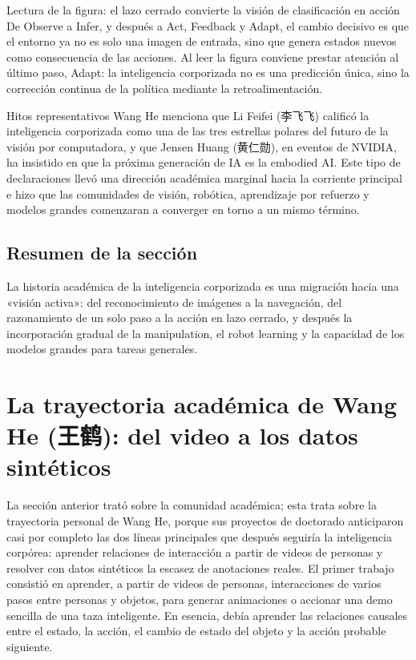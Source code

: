 \documentclass[a4paper]{article}
\begin{document}
\begin{knowledgebox}{Lectura de la figura: el lazo cerrado convierte la visión de clasificación en acción}
De Observe a Infer, y después a Act, Feedback y Adapt, el cambio decisivo es que el entorno ya no es solo una imagen de entrada, sino que genera estados nuevos como consecuencia de las acciones. Al leer la figura conviene prestar atención al último paso, Adapt: la inteligencia corporizada no es una predicción única, sino la corrección continua de la política mediante la retroalimentación.
\end{knowledgebox}

\begin{importantbox}{Hitos representativos}
Wang He menciona que Li Feifei (李飞飞) calificó la inteligencia corporizada como una de las tres estrellas polares del futuro de la visión por computadora, y que Jensen Huang (黄仁勋), en eventos de NVIDIA, ha insistido en que la próxima generación de IA es la embodied AI. Este tipo de declaraciones llevó una dirección académica marginal hacia la corriente principal e hizo que las comunidades de visión, robótica, aprendizaje por refuerzo y modelos grandes comenzaran a converger en torno a un mismo término.
\end{importantbox}

\subsection{Resumen de la sección}

La historia académica de la inteligencia corporizada es una migración hacia una «visión activa»: del reconocimiento de imágenes a la navegación, del razonamiento de un solo paso a la acción en lazo cerrado, y después la incorporación gradual de la manipulation, el robot learning y la capacidad de los modelos grandes para tareas generales.
\section{La trayectoria académica de Wang He (王鹤): del video a los datos sintéticos}

La sección anterior trató sobre la comunidad académica; esta trata sobre la trayectoria personal de Wang He, porque sus proyectos de doctorado anticiparon casi por completo las dos líneas principales que después seguiría la inteligencia corpórea: aprender relaciones de interacción a partir de videos de personas y resolver con datos sintéticos la escasez de anotaciones reales. El primer trabajo consistió en aprender, a partir de videos de personas, interacciones de varios pasos entre personas y objetos, para generar animaciones o accionar una demo sencilla de una taza inteligente. En esencia, debía aprender las relaciones causales entre el estado, la acción, el cambio de estado del objeto y la acción probable siguiente.
\end{document}
